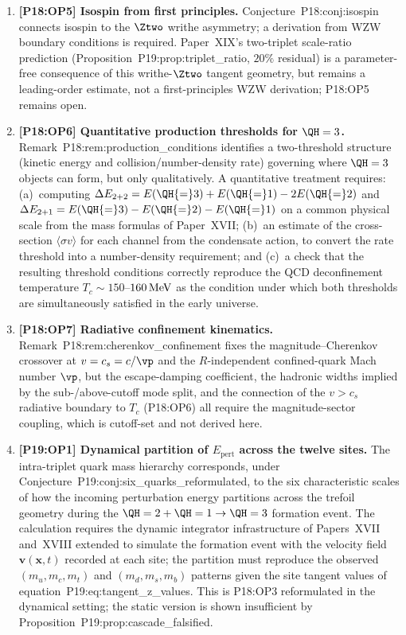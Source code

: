 \begin{enumerate}[label=,leftmargin=*]
\item \textbf{[P18:OP5] Isospin from first principles.}
Conjecture~P18:conj:isospin connects isospin to the $\Ztwo$ writhe asymmetry; a
derivation from WZW boundary conditions is required.
Paper~XIX's two-triplet scale-ratio prediction
(Proposition~P19:prop:triplet\_ratio, $20\%$ residual) is a
parameter-free consequence of this writhe-$\Ztwo$ tangent geometry, but
remains a leading-order estimate, not a first-principles WZW derivation;
P18:OP5 remains open.

\item \textbf{[P18:OP6] Quantitative production thresholds for $\QH=3$.}
Remark~P18:rem:production\_conditions identifies a two-threshold structure
(kinetic energy and collision/number-density rate) governing where $\QH=3$
objects can form, but only qualitatively. A quantitative treatment requires:
(a)~computing $\Delta E_{2+2}=E(\QH{=}3)+E(\QH{=}1)-2E(\QH{=}2)$ and
$\Delta E_{2+1}=E(\QH{=}3)-E(\QH{=}2)-E(\QH{=}1)$ on a common physical scale
from the mass formulas of Paper~XVII; (b)~an estimate of the cross-section
$\langle\sigma v\rangle$ for each channel from the condensate action, to
convert the rate threshold into a number-density requirement; and (c)~a check
that the resulting threshold conditions correctly reproduce the QCD
deconfinement temperature $T_c\sim150$--$160\,{\rm MeV}$ as the condition
under which both thresholds are simultaneously satisfied in the early
universe.

\item \textbf{[P18:OP7] Radiative confinement kinematics.}
Remark~P18:rem:cherenkov\_confinement fixes the magnitude--Cherenkov
crossover at $v=c_s=c/\vp$ and the $R$-independent confined-quark Mach
number $\vp$, but the escape-damping coefficient, the hadronic widths
implied by the sub-/above-cutoff mode split, and the connection of the
$v>c_s$ radiative boundary to $T_c$ (P18:OP6) all require the
magnitude-sector coupling, which is cutoff-set and not derived here.

\item \textbf{[P19:OP1] Dynamical partition of $E_{\mathrm{pert}}$ across the twelve sites.}
The intra-triplet quark mass hierarchy corresponds, under
Conjecture~P19:conj:six\_quarks\_reformulated, to the six characteristic
scales of how the incoming perturbation energy partitions across the
trefoil geometry during the $\QH=2+\QH=1\to\QH=3$ formation event. The
calculation requires the dynamic integrator infrastructure of
Papers~XVII and~XVIII extended to simulate the formation event with the
velocity field $\mathbf v(\mathbf x,t)$ recorded at each site; the
partition must reproduce the observed $(m_u,m_c,m_t)$ and
$(m_d,m_s,m_b)$ patterns given the site tangent values of
equation~P19:eq:tangent\_z\_values. This is P18:OP3 reformulated in the
dynamical setting; the static version is shown insufficient by
Proposition~P19:prop:cascade\_falsified.


\end{enumerate}
